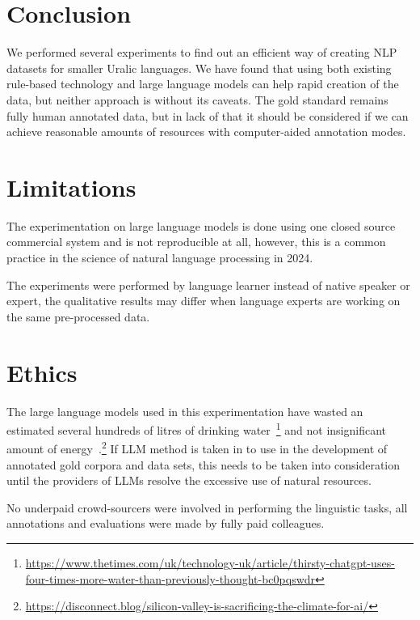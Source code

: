 \documentclass[free]{flammie}
\begin{document}
\section{Conclusion}

We performed several experiments to find out an efficient way of creating NLP
datasets for smaller Uralic languages.  We have found that using both existing
rule-based technology and large language models can help rapid creation of the
data, but neither approach is without its caveats.  The gold standard remains
fully human annotated data, but in lack of that it should be considered if we
can achieve reasonable amounts of resources with computer-aided annotation
modes.

\section*{Limitations}

The experimentation on large language models is done using one closed source
commercial system and is not reproducible at all, however, this is a common
practice in the science of natural language processing in 2024.

The experiments were performed by language learner instead of native speaker or
expert, the qualitative results may differ when language experts are working on
the same pre-processed data.

\section*{Ethics}

The large language models used in this experimentation have wasted an estimated
several hundreds of litres of drinking
water~\footnote{\url{https://www.thetimes.com/uk/technology-uk/article/thirsty-chatgpt-uses-four-times-more-water-than-previously-thought-bc0pqswdr}}
and not insignificant amount of
energy~\cite{strubell2019energy}.\footnote{\url{https://disconnect.blog/silicon-valley-is-sacrificing-the-climate-for-ai/}}
If LLM method is taken in to use in the development of annotated gold corpora
and data sets, this needs to be taken into consideration until the providers of
LLMs resolve the excessive use of natural resources.

No underpaid crowd-sourcers were involved in performing the linguistic tasks,
all annotations and evaluations were made by fully paid colleagues.


\end{document}
